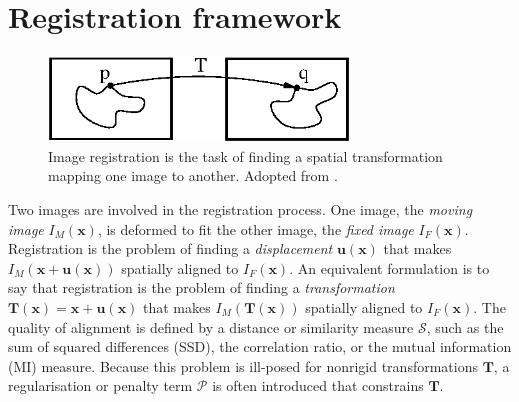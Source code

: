 \documentclass[]{report}
\newcommand{\vx}{\bm{x}}
\newcommand{\vux}{\bm{u}(\bm{x})}
\newcommand{\vT}{\bm{T}}
\newcommand{\Sim}{\mathcal{S}}
\newcommand{\Pen}{\mathcal{P}}
\begin{document}
\section{Registration framework}\label{sec:framework}

\begin{figure}
\centering
\includegraphics[width=8cm]{ImageRegistrationConcept.eps}
\caption{Image registration is the task of finding a spatial
transformation mapping one image to another. Adopted from
\citet{ITKSoftwareGuideSecondEdition}.} \label{fig:concept}
\end{figure}

Two images are involved in the registration process. One image, the
\emph{moving image} $I_M(\vx)$, is deformed to fit the other image,
the \emph{fixed image} $I_F(\vx)$. Registration is the problem of
finding a \emph{displacement} $\vux$ that makes $I_M(\vx + \vux)$
spatially aligned to $I_F(\vx)$. An equivalent formulation is to say
that registration is the problem of finding a \emph{transformation}
$\vT(\vx) = \vx + \vux $ that makes $I_M(\vT(\vx))$ spatially aligned
to $I_F(\vx)$. The quality of alignment is defined by a distance or
similarity measure $\Sim$, such as the sum of squared differences
(SSD), the correlation ratio, or the mutual information (MI) measure.
Because this problem is ill-posed for nonrigid transformations $\vT$,
a regularisation or penalty term $\Pen$ is often introduced that
constrains $\vT$.
\end{document}
